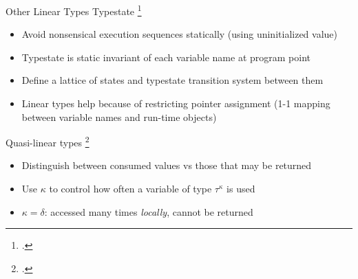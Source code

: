 \documentclass[aspectratio=169]{beamer}
\begin{document}
\begin{frame}{Other Linear Types}
  Typestate \footcite{strom_typestate:_1986}
    \begin{itemize}
        \item Avoid nonsensical execution sequences statically (using uninitialized value)
        \item Typestate is static invariant of each variable name at program point %
        \item Define a lattice of states and typestate transition system between them
        \item Linear types help because of restricting pointer assignment (1-1 mapping between variable names and run-time objects)
    \end{itemize}

  Quasi-linear types \footcite{kobayashi_quasi-linear_1999} %
    \begin{itemize}
        \item Distinguish between consumed values vs those that may be returned
        \item Use $\kappa$ to control how often a variable of type $\tau^{\kappa}$ is used
        \item $\kappa = \delta$: accessed many times \emph{locally}, cannot be returned
    \end{itemize}
    \vspace{0.1in}
\end{frame}
\end{document}
